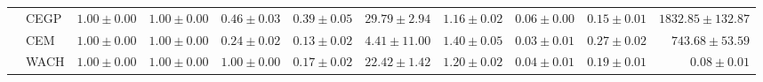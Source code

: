 \begin{table}[ht]
\begin{center}
\begin{sc}
\begin{scriptsize}
\begin{tabular}{l|l|rrrrrrrrr}
 & CEGP & $\boldsymbol{1.00\pm{0.00}}$ & $\boldsymbol{1.00\pm{0.00}}$ & $0.46\pm{0.03}$ & $0.39\pm{0.05}$ & $29.79\pm{2.94}$ & $1.16\pm{0.02}$ & $0.06\pm{0.00}$ & $0.15\pm{0.01}$ & $1832.85\pm{132.87}$ \\
 & CEM & $\boldsymbol{1.00\pm{0.00}}$ & $\boldsymbol{1.00\pm{0.00}}$ & $0.24\pm{0.02}$ & $0.13\pm{0.02}$ & $4.41\pm{11.00}$ & $1.40\pm{0.05}$ & $0.03\pm{0.01}$ & $0.27\pm{0.02}$ & $743.68\pm{53.59}$ \\
 & WACH & $\boldsymbol{1.00\pm{0.00}}$ & $\boldsymbol{1.00\pm{0.00}}$ & $\boldsymbol{1.00\pm{0.00}}$ & $0.17\pm{0.02}$ & $22.42\pm{1.42}$ & $1.20\pm{0.02}$ & $0.04\pm{0.01}$ & $0.19\pm{0.01}$ & $\boldsymbol{0.08\pm{0.01}}$ \\
\bottomrule
\end{tabular}
\end{scriptsize}
\end{sc}
\end{center}
\end{table}


